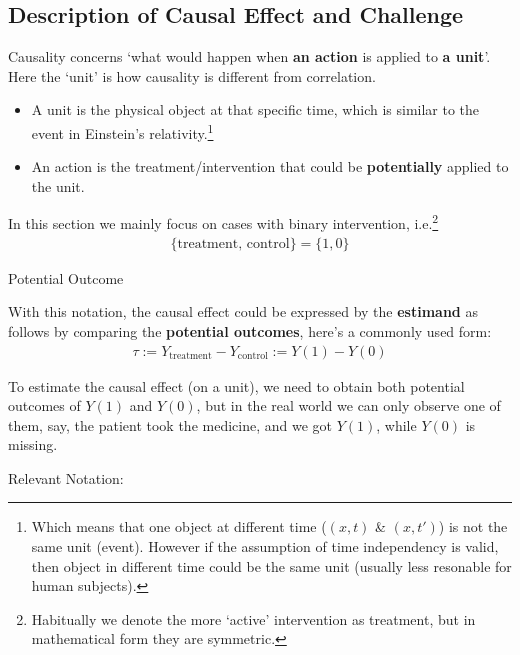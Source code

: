 \subsection{Description of Causal Effect and Challenge}
    Causality concerns `what would happen when \textbf{an action} is applied to \textbf{a unit}'. Here the `unit' is how causality is different from correlation.
\begin{itemize}[topsep=2pt,itemsep=0pt]
    \item A unit is the physical object at that specific time, which is similar to the event in Einstein's relativity.\footnote{Which means that one object at different time ($ (x,t) $ \& $ (x,t') $) is not the same unit (event). However if the assumption of time independency is valid, then object in different time could be the same unit (usually less resonable for human subjects).}
    \item An action is the treatment/intervention that could be \textbf{potentially} applied to the unit. 
\end{itemize}

    In this section we mainly focus on cases with binary intervention, i.e.\footnote{Habitually we denote the more `active' intervention as treatment, but in mathematical form they are symmetric.}
    \begin{align}
        \{\mathrm{treatment},\,\mathrm{control} \}=\{1,0\} 
    \end{align}

\begin{point}
    Potential Outcome
\end{point}

    With this notation, the causal effect could be expressed by the \textbf{estimand} as follows by  comparing the \textbf{potential outcomes}, here's a commonly used form:
    \begin{align}
        \tau:=Y_\mathrm{treatment} -Y_\mathrm{control} :=Y(1)-Y(0)
    \end{align}

    To estimate the causal effect (on a unit), we need to obtain both potential outcomes of $ Y(1) $ and $ Y(0) $, but in the real world we can only observe one of them, say, the patient took the medicine, and we got $ Y(1) $, while $ Y(0) $ is missing.

    Relevant Notation:


